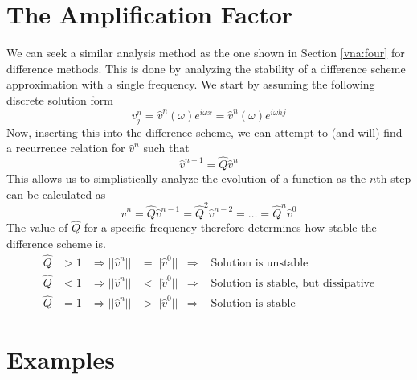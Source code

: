 \section{The Amplification Factor}
We can seek a similar analysis method as the one shown in Section \ref{vna:four} for difference methods. This is done by analyzing the stability of a difference scheme approximation with a single frequency. We start by assuming the following discrete solution form
\begin{equation}\label{vna:eq:freq}
 v^n_j = \hat{v}^n(\omega)e^{i\omega x} = \hat{v}^n(\omega)e^{i\omega hj}
\end{equation}
Now, inserting this into the difference scheme, we can attempt to (and will) find a recurrence relation for $\hat{v}^n$ such that
\begin{equation}\label{vna:eq:Q}
  \hat{v}^{n+1} = \hat{Q}\hat{v}^n
\end{equation}
This allows us to simplistically analyze the evolution of a function as the $n$th step can be calculated as
\begin{equation}\label{vna:eq:Qn}
  \hat{v}^n = \hat{Q}\hat{v}^{n-1} = \hat{Q}^2\hat{v}^{n-2} = \dots = \hat{Q}^n\hat{v}^0
\end{equation}
The value of $\hat{Q}$ for a specific frequency therefore determines how stable the difference scheme is.
\begin{align*}
  \hat{Q} &> 1&\Rightarrow ||\hat{v}^n||&= ||\hat{v}^0||&\Rightarrow &\text{ Solution is unstable} \\
  \hat{Q} &< 1&\Rightarrow ||\hat{v}^n||&< ||\hat{v}^0||&\Rightarrow &\text{ Solution is stable, but dissipative} \\
  \hat{Q} &= 1&\Rightarrow ||\hat{v}^n||&> ||\hat{v}^0||&\Rightarrow &\text{ Solution is stable}
\end{align*}
\section{Examples}
